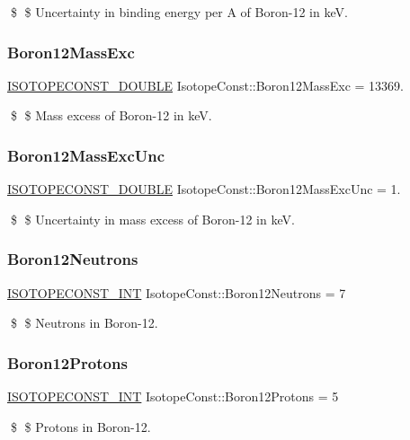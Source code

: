 \$ \$ Uncertainty in binding energy per A of Boron-\/12 in keV. \mbox{\label{group___isotope_const-_boron-_b12_gaabdd755065c10f3e7a689c3d3f642df5}} 
\subsubsection{\texorpdfstring{Boron12\+Mass\+Exc}{Boron12MassExc}}
{\footnotesize\ttfamily \mbox{\hyperlink{group___isotope_const-_macros_ga8f45a7272ce02c0b4c65c44636ed719a}{I\+S\+O\+T\+O\+P\+E\+C\+O\+N\+S\+T\+\_\+\+D\+O\+U\+B\+LE}} Isotope\+Const\+::\+Boron12\+Mass\+Exc = 13369.}

\$ \$ Mass excess of Boron-\/12 in keV. \mbox{\label{group___isotope_const-_boron-_b12_gac721f7967cff55a88cbec2ffdec43c99}} 
\subsubsection{\texorpdfstring{Boron12\+Mass\+Exc\+Unc}{Boron12MassExcUnc}}
{\footnotesize\ttfamily \mbox{\hyperlink{group___isotope_const-_macros_ga8f45a7272ce02c0b4c65c44636ed719a}{I\+S\+O\+T\+O\+P\+E\+C\+O\+N\+S\+T\+\_\+\+D\+O\+U\+B\+LE}} Isotope\+Const\+::\+Boron12\+Mass\+Exc\+Unc = 1.}

\$ \$ Uncertainty in mass excess of Boron-\/12 in keV. \mbox{\label{group___isotope_const-_boron-_b12_gad7226c695d34ad5dd0b0832c49045c21}} 
\subsubsection{\texorpdfstring{Boron12\+Neutrons}{Boron12Neutrons}}
{\footnotesize\ttfamily \mbox{\hyperlink{group___isotope_const-_macros_ga5f18360b3e99483a35c32d789e62621c}{I\+S\+O\+T\+O\+P\+E\+C\+O\+N\+S\+T\+\_\+\+I\+NT}} Isotope\+Const\+::\+Boron12\+Neutrons = 7}

\$ \$ Neutrons in Boron-\/12. \mbox{\label{group___isotope_const-_boron-_b12_gae284f60786b1649d05b5fe7b321055e3}} 
\subsubsection{\texorpdfstring{Boron12\+Protons}{Boron12Protons}}
{\footnotesize\ttfamily \mbox{\hyperlink{group___isotope_const-_macros_ga5f18360b3e99483a35c32d789e62621c}{I\+S\+O\+T\+O\+P\+E\+C\+O\+N\+S\+T\+\_\+\+I\+NT}} Isotope\+Const\+::\+Boron12\+Protons = 5}

\$ \$ Protons in Boron-\/12. 